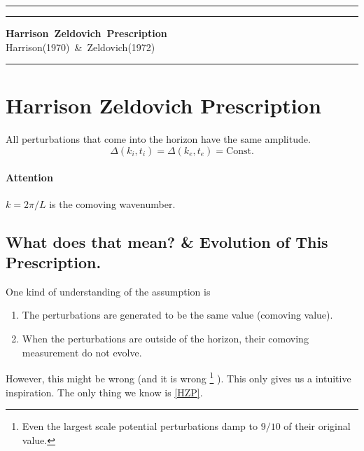






\hrule\vspace{1pt}\hrule
\begin{center}
\mbox{{\bf Harrison Zeldovich Prescription}} \\
\vspace{0.5em}
\mbox{{Harrison(1970) \& Zeldovich(1972)}}
\end{center}
\hrule



\section{Harrison Zeldovich Prescription}
All perturbations that come into the horizon have the same amplitude.
\begin{equation}
\Delta(k_i,t_i)=\Delta(k_e,t_e)=\text{Const.} \label{HZP}
\end{equation}

\paragraph{Attention} $k=2\pi/L$ is the comoving wavenumber.







\subsection{What does that mean? \& Evolution of This Prescription.}

One kind of understanding of the assumption is
\begin{enumerate}
\item
The perturbations are generated to be the same value (comoving value).

\item
When the perturbations are outside of the horizon, their comoving measurement do not evolve.

\end{enumerate}

However, this might be wrong (and it is wrong
\footnote{Even the largest scale potential perturbations damp to $9/10$ of their original value.}
). This only gives us a intuitive inspiration. The only thing we know is \ref{HZP}.



